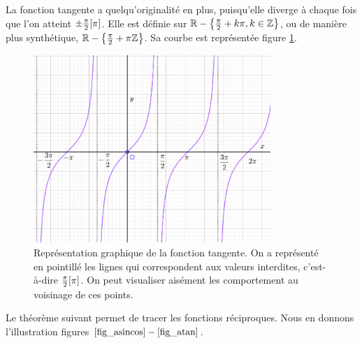 		La fonction tangente a quelqu'originalité en plus, puisqu'elle diverge à chaque fois que l'on atteint $\pm\frac{\pi}{2}[\pi]$. Elle est définie sur $\mathbb{R}-\left\{\frac{\pi}{2}+k\pi,k\in\mathbb{Z}\right\}$, ou de manière plus synthétique, $\mathbb{R}-\left\{\frac{\pi}{2}+\pi\mathbb{Z}\right\}$. Sa courbe est représentée figure \ref{fig_plot_tan}.

		\begin{figure}
			\includegraphics[width=0.8\textwidth]{image/fct_trigo/plot_tan.png}
			\caption{Représentation graphique de la fonction tangente. On a représenté en pointillé les lignes qui correspondent aux valeurs interdites, c'est-à-dire $\frac{\pi}{2}[\pi]$. On peut visualiser aisément les comportement  au voisinage de ces points.}
			\label{fig_plot_tan}
		\end{figure}

		Le théorème suivant permet de tracer les fonctions réciproques. Nous en donnons l'illustration figures $\ref{fig_asincos}-\ref{fig_atan}$.

